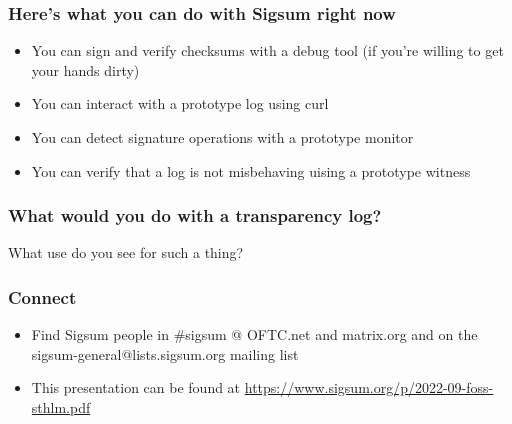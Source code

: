 \begin{frame}
  \frametitle{Here's what you can do with Sigsum right now}

  \begin{itemize}
  \item<1-> You can sign and verify checksums with a debug tool (if
    you’re willing to get your hands dirty)
  \item<2-> You can interact with a prototype log using curl
  \item<3-> You can detect signature operations with a prototype
    monitor
  \item<4-> You can verify that a log is not misbehaving uising a
    prototype witness
  \end{itemize}
\end{frame}

\begin{frame}
  \frametitle{What would you do with a transparency log?}

  \centerline{What use do you see for such a thing?}

\end{frame}

\begin{frame}
  \frametitle{Connect}
  \begin{itemize}
  \item<1-> Find Sigsum people in \#sigsum @ OFTC.net and matrix.org
    and on the sigsum-general@lists.sigsum.org mailing list
  \item<2-> This presentation can be found at
    \url{https://www.sigsum.org/p/2022-09-foss-sthlm.pdf}
  \end{itemize}
\end{frame}
